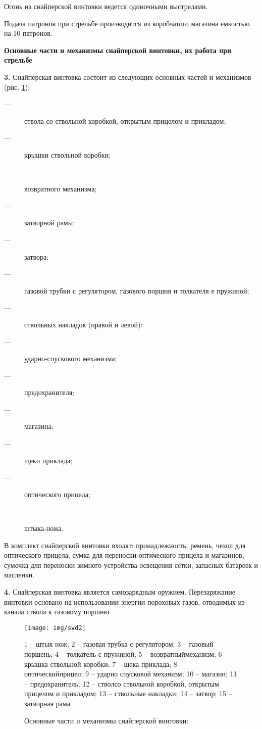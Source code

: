 \documentclass[12pt,a4paper]{report}
\begin{document}
Огонь из снайперской винтовки ведется одиночными выстрелами.

Подача патронов при стрельбе производится из коробчатого магазина емкостью на 10 патронов.

\textbf{Основные части и механизмы снайперской винтовки, их работа при стрельбе}

\textbf{3.} Снайперская винтовка состоит из следующих основных частей и механизмов (рис. \ref{fig:svd2}):
\begin{description}
\item[---] ствола со ствольной коробкой, открытым прицелом и прикладом;
\item[---]крышки ствольной коробки;
\item[---]возвратного механизма;
\item[---] затворной рамы;
\item[---]затвора;
\item[---]газовой трубки с регулятором, газового поршня и толкателя е пружиной;
\item[---] ствольных накладок (правой и левой):
\item[---] ударно-спускового механизма;
\item[---]предохранителя;
\item[---] магазина;
\item[---] щеки приклада;
\item[---] оптического прицела;
\item[---] штыка-ножа.
\end{description}

В комплект снайперской винтовки входят: принадлежность, ремень, чехол для оптического прицела, сумка для переноски оптического прицела и магазинов, сумочка для переноски зимнего устройства освещения сетки, запасных батареек и масленки.

\textbf{4. }Снайперская винтовка является самозарядным оружием. Перезаряжание винтовки основано на использовании энергии пороховых газов, отводимых из канала ствола к газовому поршню

\begin{figure}
\centering
\texttt{[image: img/svd2]}
\caption{Основные части и механизмы снайперской винтовки:}{1 – штык нож; 2 – газовая трубка с регулятором; 3 – газовый поршень; 4 – толкатель с пружиной; 5 – возвратныймеханизм; 6 – крышка ствольной коробки; 7 – щека приклада; 8 – оптическийприцел; 9 – ударно спусковой механизм; 10 – магазин; 11 – предохранитель; 12 – стволсо ствольной коробкой, открытым прицелом и прикладом; 13 – ствольные накладки; 14 – затвор; 15 – затворная рама}
\label{fig:svd2}
\end{figure}
\end{document}
